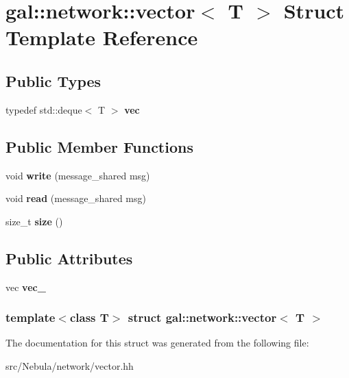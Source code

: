 \hypertarget{structgal_1_1network_1_1vector}{\section{gal\-:\-:network\-:\-:vector$<$ \-T $>$ \-Struct \-Template \-Reference}
\label{structgal_1_1network_1_1vector}
}
\subsection*{\-Public \-Types}
\begin{DoxyCompactItemize}
\item 
\hypertarget{structgal_1_1network_1_1vector_af890cdbf59fd597b4034c4edf9a1826c}{typedef std\-::deque$<$ \-T $>$ {\bfseries vec}}\label{structgal_1_1network_1_1vector_af890cdbf59fd597b4034c4edf9a1826c}

\end{DoxyCompactItemize}
\subsection*{\-Public \-Member \-Functions}
\begin{DoxyCompactItemize}
\item 
\hypertarget{structgal_1_1network_1_1vector_aad0e2d9ae7b9eb9af0173690fca44db6}{void {\bfseries write} (message\-\_\-shared msg)}\label{structgal_1_1network_1_1vector_aad0e2d9ae7b9eb9af0173690fca44db6}

\item 
\hypertarget{structgal_1_1network_1_1vector_a9049ddcdf1c2f6e5722899f8363162fc}{void {\bfseries read} (message\-\_\-shared msg)}\label{structgal_1_1network_1_1vector_a9049ddcdf1c2f6e5722899f8363162fc}

\item 
\hypertarget{structgal_1_1network_1_1vector_adbffe90ff20f537ee98b611e0a5f474c}{size\-\_\-t {\bfseries size} ()}\label{structgal_1_1network_1_1vector_adbffe90ff20f537ee98b611e0a5f474c}

\end{DoxyCompactItemize}
\subsection*{\-Public \-Attributes}
\begin{DoxyCompactItemize}
\item 
\hypertarget{structgal_1_1network_1_1vector_a4efde91878f4a0e451955b18dcc6a7bd}{vec {\bfseries vec\-\_\-}}\label{structgal_1_1network_1_1vector_a4efde91878f4a0e451955b18dcc6a7bd}

\end{DoxyCompactItemize}
\subsubsection*{template$<$class T$>$ struct gal\-::network\-::vector$<$ T $>$}



\-The documentation for this struct was generated from the following file\-:\begin{DoxyCompactItemize}
\item 
src/\-Nebula/network/vector.\-hh\end{DoxyCompactItemize}
